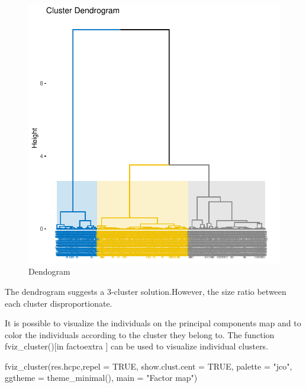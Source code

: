 \documentclass[12pt]{article}
\begin{document}
\begin{figure}[H]
\begin{center}
\includegraphics[scale=1.]{dentogram.pdf} 
\caption[]{Dendogram }
\end{center}
\end{figure}

The dendrogram suggests a 3-cluster solution.However, the size ratio between each cluster disproportionate.

It is possible to visualize the individuals on the principal components map and to color the individuals according to the cluster they belong to. The function fviz\_cluster()[in factoextra ] can be used to visualize individual clusters.

\begin{customFrame}

fviz_cluster(res.hcpc,repel = TRUE,            
             show.clust.cent = TRUE, 
             palette = "jco",         
             ggtheme = theme_minimal(),
             main = "Factor map")
             
\end{customFrame}
\end{document}
